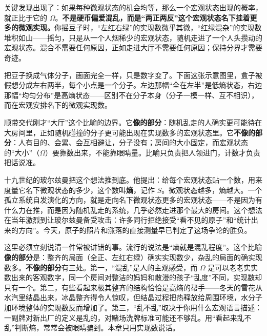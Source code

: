 关键发现出现了：如果每种微观状态的机会均等，那么一个宏观状态出现的概率，就正比于它的 \(\Omega\)。\textbf{不是硬币偏爱混乱，而是“两正两反”这个宏观状态名下挂着更多的微观实现。}你摇豆子时，“左红右绿”的实现数微乎其微，“红绿混杂”的实现数堆积如山——摇匀，只是从一个人烟稀少的宏观状态，随机走进了一个人头攒动的宏观状态。混合不需要任何原因，正如走进大厅不需要任何原因；保持分界才需要奇迹。

把豆子换成气体分子，画面完全一样，只是数字变了。下面这张示意图里，盒子被假想分成左右两半，每个小点是一个分子。左边那幅“全在左半”是低熵状态，右边那幅“均匀分布”是高熵状态——区别不在分子本身（分子一模一样、互不相识），而在宏观安排名下的微观实现数。

\begin{center}
\end{center}

顺带交代刚才“大厅”这个比喻的边界。它\textbf{像的部分}：随机乱走的人确实更可能待在大房间里，正如随机碰撞的分子更可能出现在实现数多的宏观状态里。它\textbf{不像的部分}：人有目的、会累、会互相避让，分子没有；房间的大小固定，而宏观状态的“大小”（\(\Omega\)）要靠数出来，不能靠眼睛量。比喻只负责把人领进门，计数才负责把话说准。

十九世纪的玻尔兹曼把这个想法推到底。他提出：给每个宏观状态贴一个数，用来度量它名下微观状态的多少，这个数叫\textbf{熵}，记作 \(S\)。微观状态越多，熵越大。一个孤立系统自发演化的方向，就是走向名下微观状态更多的宏观状态——不是因为有什么力在推，而是因为随机乱走的系统，几乎必然走进那个最大的房间。这个想法在当年激烈到让玻尔兹曼备受攻击：许多同行拒绝接受“看不见的原子”和“统计出来的方向”。今天，原子的照片和涨落的直接测量早已判定了这场争论的胜负。

这里必须立刻说清一件常被讲错的事。流行的说法是“熵就是混乱程度”。这个比喻\textbf{像的部分}是：整齐的局面（全正、左红右绿）确实实现数少，杂乱的局面的确实现数多。\textbf{不像的部分}有三处。第一，“混乱”是人的主观感受，而 \(\Omega\) 是可以老老实实数出来的客观数字，同一个房间对整洁的妈妈和散漫的孩子“乱度”不同，实现数却只有一个。第二，有些看起来极其整齐的结构恰恰是高熵的帮手——冬天的雪花从水汽里结晶出来，冰晶整齐得令人惊叹，但结晶过程把热释放给周围环境，水分子加环境整体的实现数反而增加了。第三，“乱不乱”取决于你用什么宏观语言描述：一副牌对新出厂的定义是乱的，对赌场洗牌标准可能还不够乱。用“看起来乱不乱”判断熵，常常会被眼睛骗到。本章只用实现数说话。


